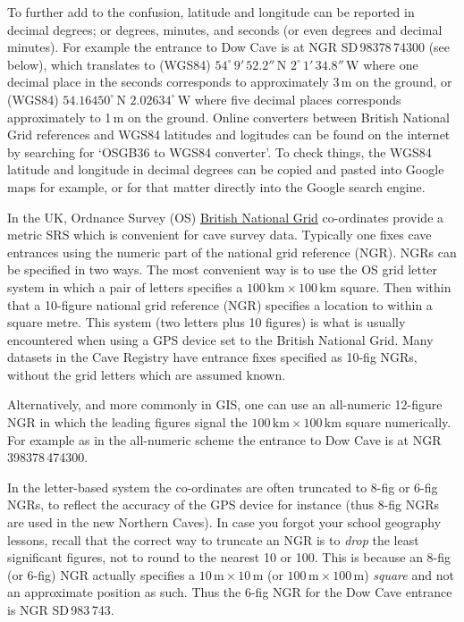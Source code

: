 \documentclass[]{article}
\begin{document}
To further add to the confusion, latitude and longitude can be reported
in decimal degrees; or degrees, minutes, and seconds (or even degrees
and decimal minutes). For example the entrance to Dow Cave is at NGR
SD\,983{\small78}\,743{\small00} (see below), which translates to (WGS84)
$54^\circ\,9'\,52.2''$\,N
$2^\circ\,1'\,34.8''$\,W where one decimal place in the
seconds corresponds to approximately 3\,m on the ground, or (WGS84)
$54.16450^\circ$\,N $2.02634^\circ$\,W where five decimal places
corresponds approximately to 1\,m on the ground. Online converters
between British National Grid references and WGS84 latitudes and
logitudes can be found on the internet by searching for `OSGB36 to WGS84
converter'. To check things, the WGS84 latitude and longitude in decimal
degrees can be copied and pasted into Google maps for example, or for
that matter directly into the Google search engine.

In the UK, Ordnance Survey (OS)
\href{https://en.wikipedia.org/wiki/Ordnance_Survey_National_Grid}{British
National Grid} co-ordinates provide a metric SRS which is convenient for
cave survey data. Typically one fixes cave entrances using the numeric
part of the national grid reference (NGR). NGRs can be specified in two
ways. The most convenient way is to use the OS grid letter system in
which a pair of letters specifies a
$100\,\mathrm{km}\times100\,\mathrm{km}$ square. Then within
that a 10-figure national grid reference (NGR) specifies a location to
within a square metre. This system (two letters plus 10 figures) is what
is usually encountered when using a GPS device set to the British
National Grid. Many datasets in the Cave Registry have entrance fixes
specified as 10-fig NGRs, without the grid letters which are assumed
known.

Alternatively, and more commonly in GIS, one can use an all-numeric
12-figure NGR in which the leading figures signal the
$100\,\mathrm{km}\times100\,\mathrm{km}$ 
square numerically. For example as in the all-numeric scheme the
entrance to Dow Cave is at NGR\,{\small3}983{\small78}\,{\small4}743{\small00}.

In the letter-based system the co-ordinates are often truncated to 8-fig
or 6-fig NGRs, to reflect the accuracy of the GPS device for instance
(thus 8-fig NGRs are used in the new Northern Caves). In case you forgot
your school geography lessons, recall that the correct way to truncate
an NGR is to \emph{drop} the least significant figures, not to round to
the nearest 10 or 100. This is because an 8-fig (or 6-fig) NGR actually
specifies a $10\,\mathrm{m}\times10\,\mathrm{m}$
(or $100\,\mathrm{m}\times100\,\mathrm{m}$) \emph{square} and not an
approximate position as such. Thus the 6-fig NGR for the Dow Cave
entrance is NGR SD\,983\,743.
\end{document}
